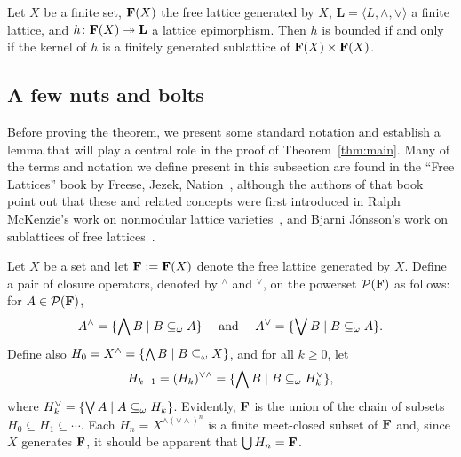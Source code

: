 \begin{theorem}
\label{thm:main}
Let $X$ be a finite set, $\mathbf{F} (X)$ the free lattice 
generated by $X$, $\mathbf L = \langle L, \wedge, \vee\rangle$ a finite lattice, and 
$h\colon \mathbf{F}(X) \twoheadrightarrow \mathbf{L}$ a lattice epimorphism.
Then $h$ is bounded if and only if the kernel of $h$ is a finitely generated 
sublattice of $\mathbf{F} (X) \times \mathbf{F} (X)$.
\end{theorem}

\subsection{A few nuts and bolts}

Before proving the theorem, we present some standard notation 
and establish a lemma that will play a central role in the proof 
of Theorem~\ref{thm:main}.
Many of the terms and notation we define present in this 
subsection are found in the ``Free Lattices'' book by Freese, 
Jezek, Nation~\cite{MR1319815}, although the authors of that book
point out that these and related concepts were first introduced in Ralph 
McKenzie's work on nonmodular lattice varieties~\cite{MR0313141}, 
and Bjarni J\'onsson's work on sublattices of free lattices~\cite{MR0472614}.

Let $X$ be a set and let $\mathbf{F}:=\mathbf{F}(X)$ denote the free lattice 
generated by $X$. Define a pair of closure operators, denoted by
$^\wedge$ and $^\vee$, on the powerset $\mathcal P (\mathbf{F})$ as follows: 
for $A\in \mathcal P (\mathbf{F})$, 
\[
A^\wedge = \{\bigwedge B \mid B \subseteq_{\omega} A\} \quad \text{ and }\quad
A^\vee = \{\bigvee B \mid B \subseteq_{\omega} A\}.
\]
Define also
$H_0 = X^\wedge = \{\bigwedge B \mid B \subseteq_{\omega} X\}$, and for all $k\geq 0$, let
\[ H_{k+1} = (H_k)^{\vee \wedge} = \{\bigwedge B \mid B \subseteq_{\omega} H_k^{\vee}\}, \]
where $H_k^{\vee} = \{\bigvee A \mid A \subseteq_{\omega} H_k\}$.
Evidently, $\mathbf{F}$ is the union of the chain of subsets 
$H_0\subseteq H_1 \subseteq \cdots$.
Each $H_n = X^{\wedge(\vee\wedge)^n}$ is a finite meet-closed 
subset of $\mathbf{F}$ and, since $X$  generates $\mathbf{F}$, 
it should be apparent that $\bigcup H_n = \mathbf{F}$. 


